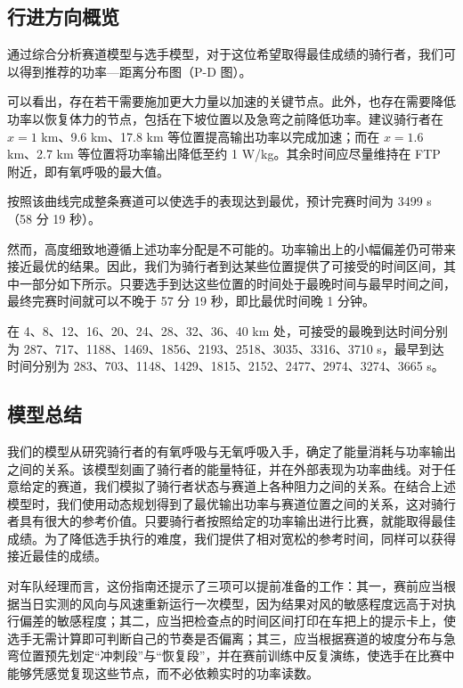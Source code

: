 \documentclass[11pt,a4paper]{ctexart}
\begin{document}
\subsection*{行进方向概览}

通过综合分析赛道模型与选手模型，对于这位希望取得最佳成绩的骑行者，我们可以得到推荐的功率—距离分布图（P-D 图）。

可以看出，存在若干需要施加更大力量以加速的关键节点。此外，也存在需要降低功率以恢复体力的节点，包括在下坡位置以及急弯之前降低功率。建议骑行者在 $x = 1$ km、9.6 km、17.8 km 等位置提高输出功率以完成加速；而在 $x = 1.6$ km、2.7 km 等位置将功率输出降低至约 1 W/kg。其余时间应尽量维持在 FTP 附近，即有氧呼吸的最大值。

按照该曲线完成整条赛道可以使选手的表现达到最优，预计完赛时间为 3499 s（58 分 19 秒）。

然而，高度细致地遵循上述功率分配是不可能的。功率输出上的小幅偏差仍可带来接近最优的结果。因此，我们为骑行者到达某些位置提供了可接受的时间区间，其中一部分如下所示。只要选手到达这些位置的时间处于最晚时间与最早时间之间，最终完赛时间就可以不晚于 57 分 19 秒，即比最优时间晚 1 分钟。

在 4、8、12、16、20、24、28、32、36、40 km 处，可接受的最晚到达时间分别为 287、717、1188、1469、1856、2193、2518、3035、3316、3710 s，最早到达时间分别为 283、703、1148、1429、1815、2152、2477、2974、3274、3665 s。

\subsection*{模型总结}

我们的模型从研究骑行者的有氧呼吸与无氧呼吸入手，确定了能量消耗与功率输出之间的关系。该模型刻画了骑行者的能量特征，并在外部表现为功率曲线。对于任意给定的赛道，我们模拟了骑行者状态与赛道上各种阻力之间的关系。在结合上述模型时，我们使用动态规划得到了最优输出功率与赛道位置之间的关系，这对骑行者具有很大的参考价值。只要骑行者按照给定的功率输出进行比赛，就能取得最佳成绩。为了降低选手执行的难度，我们提供了相对宽松的参考时间，同样可以获得接近最佳的成绩。

对车队经理而言，这份指南还提示了三项可以提前准备的工作：其一，赛前应当根据当日实测的风向与风速重新运行一次模型，因为结果对风的敏感程度远高于对执行偏差的敏感程度；其二，应当把检查点的时间区间打印在车把上的提示卡上，使选手无需计算即可判断自己的节奏是否偏离；其三，应当根据赛道的坡度分布与急弯位置预先划定“冲刺段”与“恢复段”，并在赛前训练中反复演练，使选手在比赛中能够凭感觉复现这些节点，而不必依赖实时的功率读数。
\end{document}
